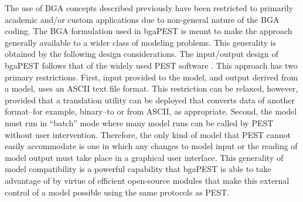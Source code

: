 \documentclass[11pt,oneside,onecolumn]{usgsreport}
\begin{document}
\begin{multicols}{2}
\begin{bibunit}


The use of BGA concepts described previously have been restricted
to primarily academic and/or custom applications due to non-general
nature of the BGA coding. The BGA formulation used in bgaPEST is meant
to make the approach generally available to a wider class of modeling
problems. This generality is obtained by the following design considerations.
The input/output design of bgaPEST follows that of the widely used
PEST software \citep{PEST,PESTAdd}. This approach has two primary
restrictions. First, input provided to the model, and output derived
from a model, uses an ASCII text file format. This restriction can
be relaxed, however, provided that a translation utility can be deployed
that converts data of another format--for example, binary--to or from
ASCII, as appropriate. Second, the model must run in ``batch'' mode
where many model runs can be called by PEST without user intervention.
Therefore, the only kind of model that PEST cannot easily accommodate
is one in which any changes to model input or the reading of model
output must take place in a graphical user interface. This generality
of model compatibility is a powerful capability that bgaPEST is able
to take advantage of by virtue of efficient open-source modules that
make this external control of a model possible using the same protocols
as PEST. 


\end{bibunit}
\end{multicols}
\end{document}
